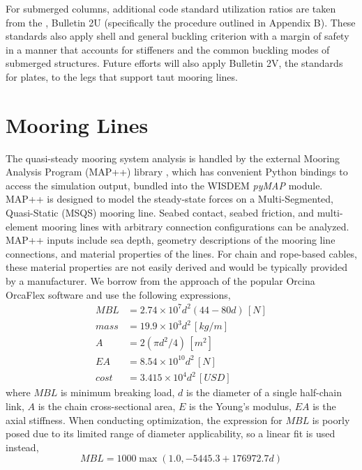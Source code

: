 For submerged columns, additional code standard utilization ratios are
taken from the \citet{api2U}, Bulletin 2U (specifically the procedure
outlined in Appendix B).  These standards also apply shell and general
buckling criterion with a margin of safety in a manner that accounts for
stiffeners and the common buckling modes of submerged structures.
Future efforts will also apply Bulletin 2V, the standards for plates, to
the legs that support taut mooring lines.


\section{Mooring Lines}
The quasi-steady mooring system analysis is handled by the external
Mooring Analysis Program (MAP++) library \citep{MAP}, which has
convenient Python bindings to access the simulation output, bundled into
the WISDEM \textit{pyMAP} module. MAP++ is designed to model the
steady-state forces on a Multi-Segmented, Quasi-Static (MSQS) mooring
line. Seabed contact, seabed friction, and multi-element mooring lines
with arbitrary connection configurations can be analyzed.  MAP++ inputs
include sea depth, geometry descriptions of the mooring line
connections, and material properties of the lines.  For chain and
rope-based cables, these material properties are not easily derived and
would be typically provided by a manufacturer.  We borrow from the
approach of the popular Orcina OrcaFlex software \citep{orca} and use
the following expressions,
\begin{align*}
MBL &= 2.74\times 10^7  d^2 \left(44 - 80d\right) \,[\unit{N}] \\
mass &= 19.9\times 10^3 d^2 \,[\unit{kg/m}]\\
A &= 2\left(\pi d^2 / 4 \right)\,[\unit{m^2}]\\
EA &= 8.54\times 10^{10} d^2\,[\unit{N}]\\
cost &= 3.415\times 10^4 d^2 \,[\unit{USD}]
\end{align*}
where $MBL$ is minimum breaking load, $d$ is the diameter of a single
half-chain link, $A$ is the chain cross-sectional area, $E$ is the
Young's modulus, $EA$ is the axial stiffness.  When conducting
optimization, the expression for $MBL$ is poorly posed due to its limited
range of diameter applicability, so a linear fit is used instead,
\begin{equation}
MBL = 1000 \max\left(1.0, -5445.3 + 176972.7 d\right)
\end{equation}  


